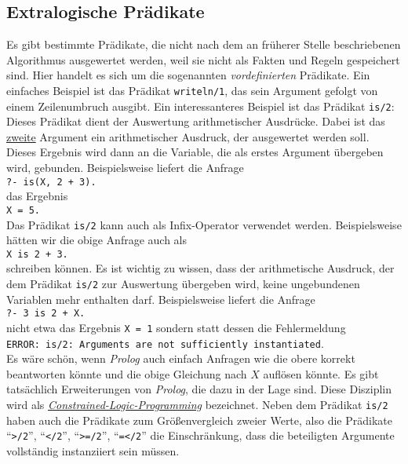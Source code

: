 \subsection{Extralogische Prädikate}
Es gibt bestimmte Prädikate, die nicht nach dem an früherer Stelle beschriebenen Algorithmus
ausgewertet werden, weil sie nicht als Fakten und Regeln gespeichert sind.  Hier handelt es sich um
die sogenannten \emph{vordefinierten} Prädikate.  Ein einfaches Beispiel ist das Prädikat
\texttt{writeln/1}, das sein Argument gefolgt von einem Zeilenumbruch ausgibt.  Ein interessanteres
Beispiel ist das Prädikat \texttt{is/2}: Dieses Prädikat dient der Auswertung arithmetischer
Ausdrücke.  Dabei ist das \underline{zweite} Argument ein arithmetischer Ausdruck, der ausgewertet
werden soll.  Dieses Ergebnis wird dann an die Variable, die als erstes Argument übergeben wird,
gebunden.  Beispielsweise liefert die Anfrage
\\[0.2cm]
\hspace*{1.3cm}
\texttt{?- is(X, 2 + 3).}
\\[0.2cm]
das Ergebnis
\\[0.2cm]
\hspace*{1.3cm}
\texttt{X = 5.}
\\[0.2cm]
Das Prädikat \texttt{is/2} kann auch als Infix-Operator verwendet werden.  Beispielsweise hätten wir
die obige Anfrage auch als
\\[0.2cm]
\hspace*{1.3cm}
\texttt{X is 2 + 3.}
\\[0.2cm]
schreiben können.  Es ist wichtig zu wissen, dass der arithmetische Ausdruck, der dem Prädikat
\texttt{is/2} zur Auswertung übergeben wird, keine ungebundenen Variablen mehr enthalten darf.
Beispielsweise liefert die Anfrage
\\[0.2cm]
\hspace*{1.3cm}
\texttt{?- 3 is 2 + X.}
\\[0.2cm]
nicht etwa das Ergebnis \texttt{X = 1} sondern statt dessen die Fehlermeldung
\\[0.2cm]
\hspace*{1.3cm}
\texttt{ERROR: is/2: Arguments are not sufficiently instantiated}.
\\[0.2cm]
Es wäre schön, wenn \textsl{Prolog} auch einfach Anfragen wie die obere korrekt beantworten könnte
und die obige Gleichung nach $X$ auflösen könnte.  Es gibt tatsächlich Erweiterungen von
\textsl{Prolog}, die dazu in der Lage sind.  Diese Disziplin wird als
\href{http://en.wikipedia.org/wiki/Constraint_logic_programming}{\emph{Constrained-Logic-Programming}} bezeichnet.
Neben dem Prädikat \texttt{is/2} haben auch die Prädikate zum Größenvergleich zweier Werte, also die
Prädikate ``\texttt{>/2}'', ``\texttt{</2}'', ``\texttt{>=/2}'', ``\texttt{=</2}'' die
Einschränkung, dass die beteiligten Argumente vollständig instanziiert sein müssen.

